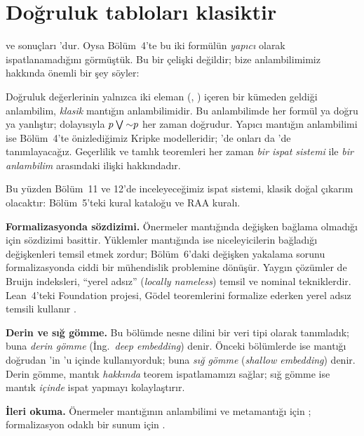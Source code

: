 \section{Doğruluk tabloları klasiktir}\label{sec:klasik-anlambilim}

 ve
 sonuçları 'dur. Oysa Bölüm~4'te bu iki
formülün \emph{yapıcı} olarak ispatlanamadığını görmüştük. Bu bir çelişki
değildir; bize anlambilimimiz hakkında önemli bir şey söyler:

\begin{onemlifikir}
Doğruluk değerlerinin yalnızca iki eleman (, )
içeren bir kümeden geldiği anlambilim, \emph{klasik} mantığın
anlambilimidir. Bu anlambilimde her formül ya doğru ya yanlıştır;
dolayısıyla $p \mathbin{\textstyle\bigvee} {\sim}p$ her zaman doğrudur. Yapıcı mantığın
anlambilimi ise Bölüm~4'te önizlediğimiz Kripke modelleridir;
'de onları da \Lean{}'de tanımlayacağız. Geçerlilik ve
tamlık teoremleri her zaman \emph{bir ispat sistemi} ile \emph{bir
anlambilim} arasındaki ilişki hakkındadır.
\end{onemlifikir}

\noindent Bu yüzden Bölüm~11 ve 12'de inceleyeceğimiz ispat sistemi,
klasik doğal çıkarım olacaktır: Bölüm~5'teki kural kataloğu ve RAA kuralı.

\begin{arastirmanotu}
\textbf{Formalizasyonda sözdizimi.} Önermeler mantığında değişken
bağlama olmadığı için sözdizimi basittir. Yüklemler mantığında ise
niceleyicilerin bağladığı değişkenleri temsil etmek zordur; Bölüm~6'daki
değişken yakalama sorunu formalizasyonda ciddi bir mühendislik
problemine dönüşür. Yaygın çözümler de Bruijn indeksleri, ``yerel
adsız'' (\emph{locally nameless}) temsil ve nominal tekniklerdir.
Lean~4'teki Foundation projesi, Gödel teoremlerini formalize ederken
yerel adsız temsili kullanır \citep{saitou2026, foundation}.

\textbf{Derin ve sığ gömme.} Bu bölümde nesne dilini bir veri tipi
olarak tanımladık; buna \emph{derin gömme} (İng.\ \emph{deep embedding})
denir. Önceki bölümlerde ise mantığı doğrudan \Lean{}'in 'u
içinde kullanıyorduk; buna \emph{sığ gömme} (\emph{shallow embedding})
denir. Derin gömme, mantık \emph{hakkında} teorem ispatlamamızı sağlar;
sığ gömme ise mantık \emph{içinde} ispat yapmayı kolaylaştırır.

\textbf{İleri okuma.} Önermeler mantığının anlambilimi ve metamantığı
için \citet{vandalen2013}; formalizasyon odaklı bir sunum için
\citet{harrison2009}.
\end{arastirmanotu}

